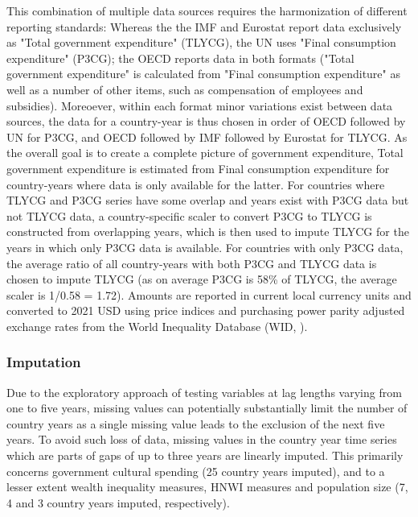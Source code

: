 \documentclass[11pt]{article}
\begin{document}
This combination of multiple data sources requires the harmonization of different reporting standards: 
Whereas the the IMF and Eurostat report data exclusively as "Total government expenditure" (TLYCG), the UN uses "Final consumption expenditure" (P3CG); the OECD reports data in both formats ("Total government expenditure" is calculated from "Final consumption expenditure" as well as a number of other items, such as compensation of employees and subsidies). 
Moreoever, within each format minor variations exist between data sources, the data for a country-year is thus chosen in order of OECD followed by UN for P3CG, and OECD followed by IMF followed by Eurostat for TLYCG.
As the overall goal is to create a complete picture of government expenditure, Total government expenditure is estimated from Final consumption expenditure for country-years where data is only available for the latter.
For countries where TLYCG and P3CG series have some overlap and years exist with P3CG data but not TLYCG data, a country-specific scaler to convert P3CG to TLYCG is constructed from overlapping years, which is then used to impute TLYCG for the years in which only P3CG data is available.
For countries with only P3CG data, the average ratio of all country-years with both P3CG and TLYCG data is chosen to impute TLYCG (as on average P3CG is 58\% of TLYCG, the average scaler is 1/0.58 = 1.72). 
Amounts are reported in current local currency units and converted to 2021 USD using price indices and purchasing power parity adjusted exchange rates from the World Inequality Database (WID,  \citeyear{WID_2021_WID}).

\subsubsection{Imputation}


Due to the exploratory approach of testing variables at lag lengths varying from one to five years, missing values can potentially substantially limit the number of country years as a single missing value leads to the exclusion of the next five years.
To avoid such loss of data, missing values in the country year time series which are parts of gaps of up to three years are linearly imputed.
This primarily concerns government cultural spending (25 country years imputed), and to a lesser extent wealth inequality measures, HNWI measures and population size (7, 4 and 3 country years imputed, respectively).
\end{document}
